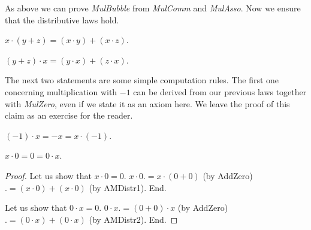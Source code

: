 \documentclass{article}
\begin{document}
  As above we can prove \textit{MulBubble} from \textit{MulComm} and \textit{MulAsso}. Now we ensure that the distributive laws hold.

  \begin{forthel}
    \begin{axiom}[AMDistr1]
      $x \cdot (y + z) = (x \cdot y) + (x \cdot z)$.
    \end{axiom}

    \begin{axiom}[AMDistr2]
      $(y + z) \cdot x = (y \cdot x) + (z \cdot x)$.
    \end{axiom}
  \end{forthel}

  The next two statements are some simple computation rules. The first one concerning multiplication with $-1$ can be derived from our previous laws together with \textit{MulZero}, even if we state it as an axiom here. We leave the proof of this claim as an exercise for the reader.

  \begin{comment}
    $$x + ((-1) \cdot x)
    = (1 \cdot x) + ((-1) \cdot x)
    = (1 + (-1)) \cdot x
    = 0 \cdot x
    = 0$$

    $$\implies (-x) + (x + ((-1) \cdot x)) = (-x) + 0$$
    $$\implies ((-x) + x) + ((-1) \cdot x) = -x$$
    $$\implies 0 + ((-1) \cdot x) = -x$$
    $$\implies ((-1) \cdot x) = -x$$

    $$(x \cdot (-1)) + x
    = (x \cdot (-1)) \cdot (x \cdot 1)
    = x \cdot ((-1) + 1)
    = x \cdot 0
    = 0$$

    $$\implies ((x \cdot (-1)) + x) - x = 0 - x$$
    $$\implies (x \cdot (-1)) + (x - x) = -x$$
    $$\implies (x \cdot (-1)) + 0 = -x$$
    $$\implies (x \cdot (-1)) = -x$$
  \end{comment}

  \begin{forthel}
    \begin{axiom}[MulMnOne]
      $(-1) \cdot x = -x = x \cdot (-1)$.
    \end{axiom}

    \begin{lemma}[MulZero]
      $x \cdot 0 = 0 = 0 \cdot x$.
    \end{lemma}
    \begin{proof}
      Let us show that $x \cdot 0 = 0$.
        $x \cdot 0 .= x \cdot (0 + 0)$ (by AddZero) $.= (x \cdot 0) + (x \cdot 0)$ (by AMDistr1).
      End.

      Let us show that $0 \cdot x = 0$.
        $0 \cdot x .= (0 + 0) \cdot x$ (by AddZero) $.= (0 \cdot x) + (0 \cdot x)$ (by AMDistr2).
      End.
    \end{proof}
  \end{forthel}
\end{document}
